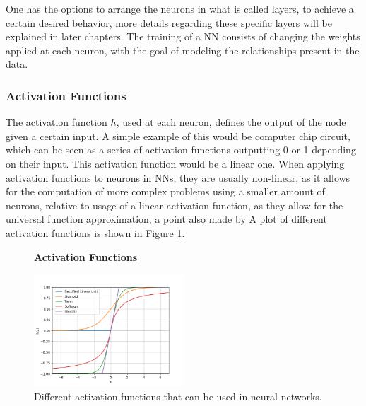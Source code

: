One has the options to arrange the neurons in what is called layers, to achieve
a certain desired behavior, more details regarding these specific layers will
be explained in later chapters. The training of a \gls{NN} consists of changing
the weights applied at each neuron, with the goal of modeling the relationships
present in the data.


\subsubsection{Activation Functions} \label{subsubsec:activation_functions}

The activation function $h$, used at each neuron, defines the output of the
node given a certain input. A simple example of this would be computer chip
circuit, which can be seen as a series of activation functions outputting 0 or
1 depending on their input. This activation function would be a linear one.
When applying activation functions to neurons in \gls{NN}s, they are usually
non-linear, as it allows for the computation of more complex problems using a
smaller amount of neurons, relative to usage of a linear activation function,
as they allow for the universal function approximation, a point also made by
\citet{6797088} A plot of different activation functions is shown in Figure
\ref{fig:activation_functions}.

\begin{figure}
    \centering
    \textbf{Activation Functions}\par\medskip
    \includegraphics[width=0.5\textwidth]{./pictures/method/activation_functions.png}
    \caption{Different activation functions that can be used in neural
        networks.}
    \label{fig:activation_functions}
\end{figure}

